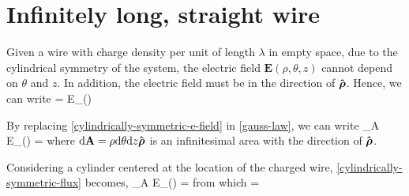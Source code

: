 \section{Infinitely long, straight wire}
Given a wire with charge density per unit of length $\lambda$ in empty space, due to the cylindrical symmetry of the system, the electric 
field $\mathbf{E}(\rho,\theta,z)$ cannot depend on $\theta$ and $z$. In addition, the electric field must be in the direction of $\boldsymbol{\hat{\textbf{$\mathrm\rho$}}}$. 
Hence, we can write
\be\label{cylindrically-symmetric-e-field}
 = E_{\rho}(\rho)\uvec{\rho}
\ee

By replacing \ref{cylindrically-symmetric-e-field} in \ref{gauss-law}, we can write
\be\label{cylindrically-symmetric-flux}
\oiint_A E_{\rho}(\rho) \cdot \uvec{\rho} \cdot {} =
\ee
where $\mathrm{d}\mathbf{A} =  \rho\mathrm{d}\theta \mathrm{d}z\boldsymbol{\hat{\textbf{$\mathrm\rho$}}}$ is an infinitesimal area with the direction of $\boldsymbol{\hat{\textbf{$\mathrm\rho$}}}$.

Considering a cylinder centered at the location of the charged wire, \ref{cylindrically-symmetric-flux} becomes,
\be\label{cylindrically-symmetric-flux-2}
\oiint_A E_{\rho}(\rho) \uvec{\rho}\cdot\uvec{\rho} \rho \total{\theta}=
\ee
from which
\be
{}=\uvec{\rho}
\ee
